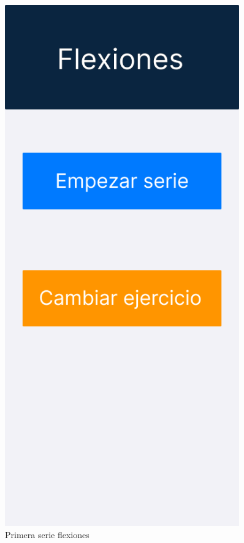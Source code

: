 \begin{figure}[H]
\begin{minipage}{0.45\textwidth}
      \label{fig:Lista ejercicios del entrenamiento actual}
   \end{minipage}%
   \hspace{0.25cm}
   \begin{minipage}{0.45\textwidth}
      \centering
      \includegraphics[width=0.9\textwidth]{fotos/Frame 2.png}
      \caption{Primera serie flexiones}
      \label{fig:Primera serie flexiones}
   \end{minipage}
\end{figure}

